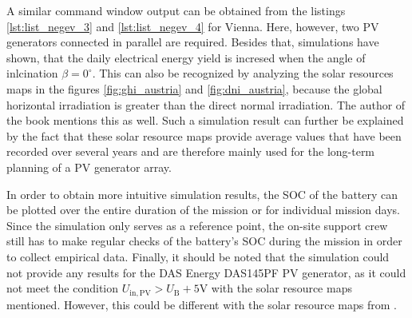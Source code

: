 A similar command window output can be obtained from the listings \ref{lst:list_negev_3} and \ref{lst:list_negev_4} for Vienna. Here, however, two PV generators connected in parallel are required. Besides that, simulations have shown, that the daily electrical energy yield is incresed when the angle of inlcination $\beta = 0^\circ$. This can also be recognized by analyzing the solar resources maps in the figures \ref{fig:ghi_austria} and \ref{fig:dni_austria}, because the global horizontal irradiation is greater than the direct normal irradiation. The author of the book \cite{Mertens:2015} mentions this as well. Such a simulation result can further be explained by the fact that these solar resource maps provide average values that have been recorded over several years and are therefore mainly used for the long-term planning of a PV generator array.

In order to obtain more intuitive simulation results, the SOC of the battery can be plotted over the entire duration of the mission or for individual mission days. Since the \MATLAB simulation only serves as a reference point, the on-site support crew still has to make regular checks of the battery's SOC during the mission in order to collect empirical data. Finally, it should be noted that the simulation could not provide any results for the DAS Energy DAS145PF PV generator, as it could not meet the condition $U_\mathrm{in,PV} > U_\mathrm{B} + 5\mathrm{V}$ with the solar resource maps mentioned. However, this could be different with the solar resource maps from \cite{Union:2020}. 


